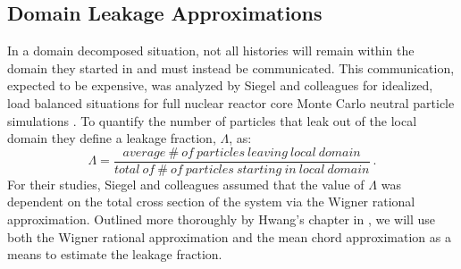 \subsection{Domain Leakage Approximations }
\label{subsec:domain_leak_approx}
In a domain decomposed situation, not all histories will remain within
the domain they started in and must instead be communicated. This
communication, expected to be expensive, was analyzed by Siegel and
colleagues for idealized, load balanced situations for full nuclear
reactor core Monte Carlo neutral particle simulations
\citep{siegel_analysis_2012}.  To quantify the number of particles
that leak out of the local domain they define a leakage fraction,
$\Lambda$, as:
\begin{equation}
  \Lambda = \frac{average\ \#\ of\ particles\ leaving\ local\ domain}
          {total\ of\ \#\ of\ particles\ starting\ in\ local\ domain}\:.
          \label{eq:leakage_fraction}
\end{equation}
For their studies, Siegel and colleagues assumed that the value of
$\Lambda$ was dependent on the total cross section of the system via
the Wigner rational approximation. Outlined more thoroughly by Hwang's
chapter in \citep{azmy_nuclear_2010}, we will use both the Wigner
rational approximation and the mean chord approximation as a means to
estimate the leakage fraction.

